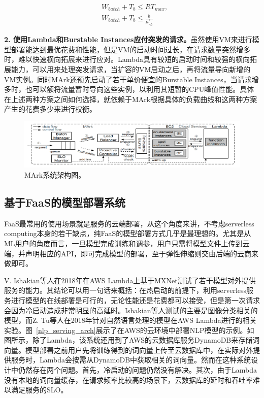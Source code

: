\begin{equation}\label{eq_batching}
    \begin{aligned}
        &W_{batch} + T_b \leq RT_{max}, \\
        &W_{batch} + T_b \leq \frac{b}{\mu^*_{nb}}
    \end{aligned}
\end{equation}

\textbf{2. 使用Lambda和Burstable Instances应付突发的请求。}虽然使用VM来进行模型部署能达到最优花费和性能，但是VM的启动时间过长，在请求数量突然增多时，难以快速横向拓展来进行应对。Lambda具有较短的启动时间和较强的横向拓展能力，可以用来处理突发请求，当扩容的VM启动之后，再将流量导向新增的VM实例。同时MArk还预先启动了若干单价便宜的Burstable Instances，当请求增多时，也可以额将流量暂时导向这些实例，以利用其短暂的CPU峰值性能。具体在上述两种方案之间如何选择，就依赖于MArk根据具体的负载曲线和这两种方案产生的花费多少来进行权衡。

\begin{figure}[h]
    \centerline{\includegraphics[width=\textwidth]{figures/mark-arch.png}}
    \caption{MArk系统架构图。}
    \label{mark_arch}
\end{figure}

\subsection{基于FaaS的模型部署系统}
FaaS最常用的使用场景就是服务的云端部署，从这个角度来讲，不考虑serverless computing本身的若干缺点，纯FaaS的模型部署方式几乎是最理想的。尤其是从ML用户的角度而言，一旦模型完成训练和调参，用户只需将模型文件上传到云端，并声明相应的API，即可完成模型的部署，至于弹性伸缩则交由后端的云商来做即可。

V. Ishakian等人\parencite{ishakian2018serving}在2018年在AWS Lambda上基于MXNet测试了若干模型对外提供服务的能力。其结论可以用一句话来概括：在热启动的前提下，利用serverless服务进行模型的在线部署是可行的，无论性能还是花费都可以接受，但是第一次请求会因为冷启动造成非常明显的高延时。Ishakian等人测试的主要是图像分类相关的模型，而Z. Tu等人\parencite{tu2018pay}在2018年针对自然语言处理的模型在AWS Lambda进行的相关实验。图~\ref{nlp_serving_arch}展示了在AWS的云环境中部署NLP模型的示例。如图所示，除了Lambda，该系统还用到了AWS的云数据库服务DynamoDB来存储词向量。模型部署之前用户先将训练得到的词向量上传至云数据库中，在实际对外提供服务时，Lambda会按需从DynamoDB中获取相关的词向量。然而在这种系统设计中仍然存在两个问题。首先，冷启动的问题仍然没有解决。其次，由于Lambda没有本地的词向量缓存，在请求频率比较高的场景下，云数据库的延时和吞吐率难以满足服务的SLO。

